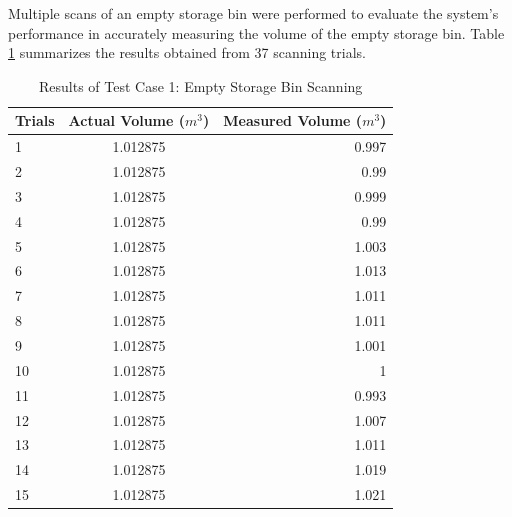 Multiple scans of an empty storage bin were performed to evaluate the system's performance in accurately measuring the volume of the empty storage bin. Table \ref{table:test_case_1_results} summarizes the results obtained from 37 scanning trials.

\begin{table}[H]
	\centering
	\caption{Results of Test Case 1: Empty Storage Bin Scanning}
	\label{table:test_case_1_results}
	\begin{tabular}{l c r}
		\toprule
		\textbf{Trials} & \textbf{Actual Volume ($m^{3}$)} & \textbf{Measured Volume} ($m^{3}$) \\ \midrule

		1               & 1.012875                         & 0.997                              \\
		2               & 1.012875                         & 0.99                               \\
		3               & 1.012875                         & 0.999                              \\
		4               & 1.012875                         & 0.99                               \\
		5               & 1.012875                         & 1.003                              \\
		6               & 1.012875                         & 1.013                              \\
		7               & 1.012875                         & 1.011                              \\
		8               & 1.012875                         & 1.011                              \\
		9               & 1.012875                         & 1.001                              \\
		10              & 1.012875                         & 1                                  \\
		11              & 1.012875                         & 0.993                              \\
		12              & 1.012875                         & 1.007                              \\
		13              & 1.012875                         & 1.011                              \\
		14              & 1.012875                         & 1.019                              \\
		15              & 1.012875                         & 1.021                              \\

\end{tabular}
\end{table}
